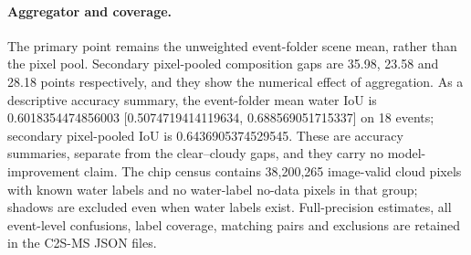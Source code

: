 \paragraph{Aggregator and coverage.}
The primary point remains the unweighted event-folder scene mean, rather than the pixel pool.
Secondary pixel-pooled composition gaps are 35.98, 23.58 and 28.18 points respectively, and they show the numerical effect of aggregation.
As a descriptive accuracy summary, the event-folder mean water IoU is 0.6018354474856003 [0.5074719414119634, 0.688569051715337] on 18 events; secondary pixel-pooled IoU is 0.6436905374529545.
These are accuracy summaries, separate from the clear--cloudy gaps, and they carry no model-improvement claim.
The chip census contains 38,200,265 image-valid cloud pixels with known water labels and no water-label no-data pixels in that group; shadows are excluded even when water labels exist.
Full-precision estimates, all event-level confusions, label coverage, matching pairs and exclusions are retained in the C2S-MS JSON files.
